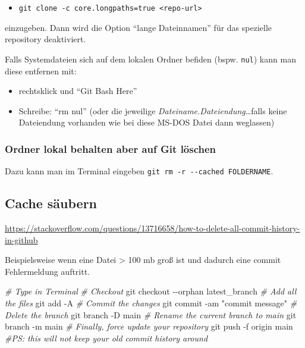 \documentclass[
]{article}
\newenvironment{Shaded}{\begin{snugshade}}{\end{snugshade}}
\newcommand{\CommentTok}[1]{\textcolor[rgb]{0.56,0.35,0.01}{\textit{#1}}}
\newcommand{\NormalTok}[1]{#1}
\newcommand{\SpecialCharTok}[1]{\textcolor[rgb]{0.00,0.00,0.00}{#1}}
\newcommand{\StringTok}[1]{\textcolor[rgb]{0.31,0.60,0.02}{#1}}
\providecommand{\tightlist}{%
  \setlength{\itemsep}{0pt}\setlength{\parskip}{0pt}}
\begin{document}
\begin{itemize}
\tightlist
\item
  \texttt{git\ clone\ -c\ core.longpaths=true\ \textless{}repo-url\textgreater{}}
\end{itemize}

einzugeben. Dann wird die Option ``lange Dateinnamen'' für das spezielle repository deaktiviert.

Falls Systemdateien sich auf dem lokalen Ordner befiden (bspw. \texttt{nul}) kann man diese entfernen mit:

\begin{itemize}
\tightlist
\item
  rechtsklick und ``Git Bash Here''
\item
  Schreibe: ``rm nul'' (oder die jeweilige \emph{Dateiname.Dateiendung}\ldots falls keine Dateiendung vorhanden wie bei diese MS-DOS Datei dann weglassen)
\end{itemize}

\hypertarget{ordner-lokal-behalten-aber-auf-git-luxf6schen}{%
\subsubsection{Ordner lokal behalten aber auf Git löschen}\label{ordner-lokal-behalten-aber-auf-git-luxf6schen}}

Dazu kann man im Terminal eingeben \texttt{git\ rm\ -r\ -\/-cached\ FOLDERNAME}.

\hypertarget{cache-suxe4ubern}{%
\subsection{Cache säubern}\label{cache-suxe4ubern}}

\url{https://stackoverflow.com/questions/13716658/how-to-delete-all-commit-history-in-github}

Beispielsweise wenn eine Datei \textgreater{} 100 mb groß ist und dadurch eine commit Fehlermeldung auftritt.

\begin{Shaded}
\begin{Highlighting}[]
\CommentTok{\# Type in Terminal}
\CommentTok{\# Checkout}
\NormalTok{git checkout }\SpecialCharTok{{-}{-}}\NormalTok{orphan latest\_branch}
\CommentTok{\# Add all the files}
\NormalTok{git add }\SpecialCharTok{{-}}\NormalTok{A }
\CommentTok{\# Commit the changes}
\NormalTok{git commit }\SpecialCharTok{{-}}\NormalTok{am }\StringTok{"commit message"}
\CommentTok{\# Delete the branch}
\NormalTok{git branch }\SpecialCharTok{{-}}\NormalTok{D main}
\CommentTok{\# Rename the current branch to main}
\NormalTok{git branch }\SpecialCharTok{{-}}\NormalTok{m main}
\CommentTok{\# Finally, force update your repository}
\NormalTok{git push }\SpecialCharTok{{-}}\NormalTok{f origin main}
\CommentTok{\#PS: this will not keep your old commit history around}
\end{Highlighting}
\end{Shaded}
\end{document}
